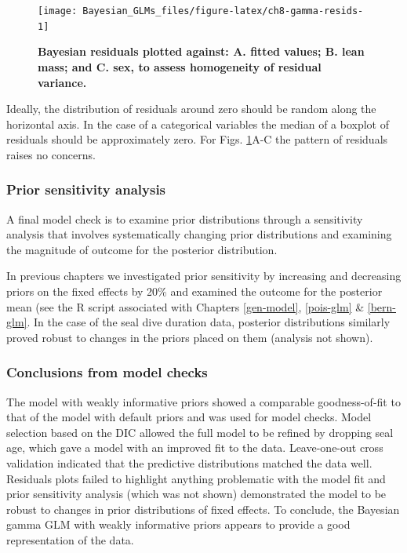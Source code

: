 \documentclass[
]{book}
\begin{document}
\begin{figure}

{\centering \texttt{[image: Bayesian\_GLMs\_files/figure-latex/ch8-gamma-resids-1]} 

}

\caption{\textbf{Bayesian residuals plotted against: A. fitted values; B. lean mass; and C. sex, to assess homogeneity of residual variance.}}\label{fig:ch8-gamma-resids}
\end{figure}

Ideally, the distribution of residuals around zero should be random along the horizontal axis. In the case of a categorical variables the median of a boxplot of residuals should be approximately zero. For Figs. \ref{fig:ch8-gamma-resids}A-C the pattern of residuals raises no concerns.

\hypertarget{gamma-sens}{%
\subsubsection{Prior sensitivity analysis}\label{gamma-sens}}

A final model check is to examine prior distributions through a sensitivity analysis that involves systematically changing prior distributions and examining the magnitude of outcome for the posterior distribution.

In previous chapters we investigated prior sensitivity by increasing and decreasing priors on the fixed effects by 20\% and examined the outcome for the posterior mean (see the R script associated with Chapters \ref{gen-model}, \ref{pois-glm} \& \ref{bern-glm}. In the case of the seal dive duration data, posterior distributions similarly proved robust to changes in the priors placed on them (analysis not shown).

\hypertarget{gamma-checkconc}{%
\subsubsection{Conclusions from model checks}\label{gamma-checkconc}}

The model with weakly informative priors showed a comparable goodness-of-fit to that of the model with default priors and was used for model checks. Model selection based on the DIC allowed the full model to be refined by dropping seal age, which gave a model with an improved fit to the data. Leave-one-out cross validation indicated that the predictive distributions matched the data well. Residuals plots failed to highlight anything problematic with the model fit and prior sensitivity analysis (which was not shown) demonstrated the model to be robust to changes in prior distributions of fixed effects. To conclude, the Bayesian gamma GLM with weakly informative priors appears to provide a good representation of the data.
\end{document}
